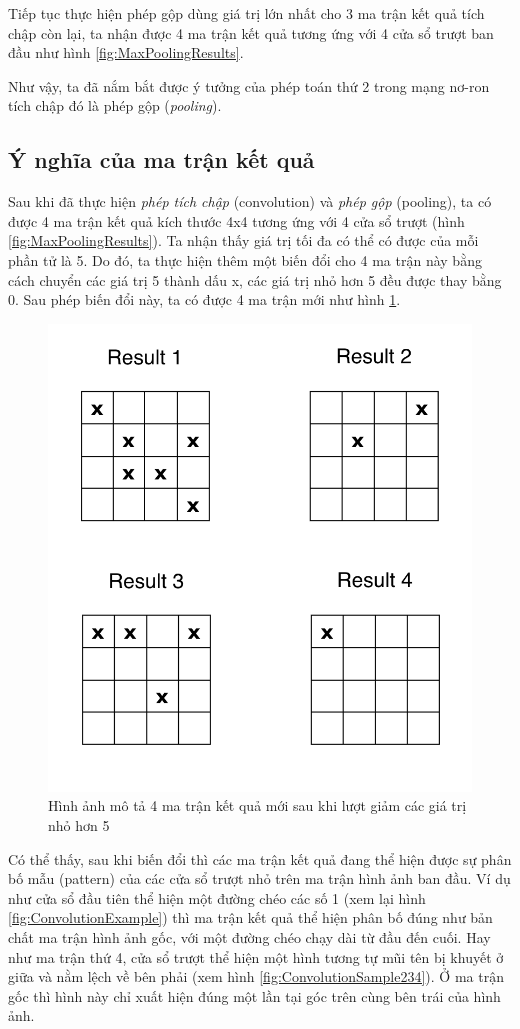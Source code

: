 Tiếp tục thực hiện phép gộp dùng giá trị lớn nhất cho 3 ma trận kết quả tích chập còn lại, ta nhận được 4 ma trận kết quả tương ứng với 4 cửa sổ trượt ban đầu như hình \ref{fig:MaxPoolingResults}.

Như vậy, ta đã nắm bắt được ý tưởng của phép toán thứ 2 trong mạng nơ-ron tích chập đó là phép gộp (\textit{pooling}).

\subsection{Ý nghĩa của ma trận kết quả}
\hspace{\parindent} Sau khi đã thực hiện \textit{phép tích chập} (convolution) và \textit{phép gộp} (pooling), ta có được 4 ma trận kết quả kích thước 4x4 tương ứng với 4 cửa sổ trượt (hình \ref{fig:MaxPoolingResults}). Ta nhận thấy giá trị tối đa có thể có được của mỗi phần tử là 5. Do đó, ta thực hiện thêm một biến đổi cho 4 ma trận này bằng cách chuyển các giá trị 5 thành dấu x, các giá trị nhỏ hơn 5 đều được thay bằng 0. Sau phép biến đổi này, ta có được 4 ma trận mới như hình \ref{fig:CNNResultsMeaning}.

\begin{figure}[!h]
	\centering
		\includegraphics[width=0.6\columnwidth]{books/artificial-neural-network/chapter05/figure/cnn_results_meaning.png}
		\centering
	\caption{Hình ảnh mô tả 4 ma trận kết quả mới sau khi lượt giảm các giá trị nhỏ hơn 5}
	\label{fig:CNNResultsMeaning}
\end{figure}

Có thể thấy, sau khi biến đổi thì các ma trận kết quả đang thể hiện được sự phân bố mẫu (pattern) của các cửa sổ trượt nhỏ trên ma trận hình ảnh ban đầu. Ví dụ như cửa sổ đầu tiên thể hiện một đường chéo các số 1 (xem lại hình \ref{fig:ConvolutionExample}) thì ma trận kết quả thể hiện phân bố đúng như bản chất ma trận hình ảnh gốc, với một đường chéo chạy dài từ đầu đến cuối. Hay như ma trận thứ 4, cửa sổ trượt thể hiện một hình tương tự mũi tên bị khuyết ở giữa và nằm lệch về bên phải (xem hình \ref{fig:ConvolutionSample234}). Ở ma trận gốc thì hình này chỉ xuất hiện đúng một lần tại góc trên cùng bên trái của hình ảnh.

